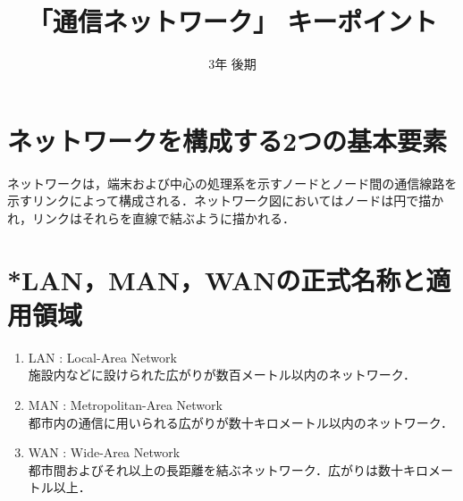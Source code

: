 \documentclass[10.5pt]{jsarticle}
\title{「通信ネットワーク」 キーポイント}
\author{}
\date{\vspace{-10mm}3年 後期}
\begin{document}
\maketitle
\thispagestyle{fancy}

\section{ネットワークを構成する2つの基本要素}
ネットワークは，端末および中心の処理系を示すノードとノード間の通信線路を示すリンクによって構成される．ネットワーク図においてはノードは円で描かれ，リンクはそれらを直線で結ぶように描かれる．

\section{*LAN，MAN，WANの正式名称と適用領域}
\begin{enumerate}
	\item{LAN : Local-Area Network}\\
		施設内などに設けられた広がりが数百メートル以内のネットワーク．
	\item{MAN : Metropolitan-Area Network}\\
		都市内の通信に用いられる広がりが数十キロメートル以内のネットワーク．
	\item{WAN : Wide-Area Network}\\
		都市間およびそれ以上の長距離を結ぶネットワーク．広がりは数十キロメートル以上．
\end{enumerate}
\end{document}
